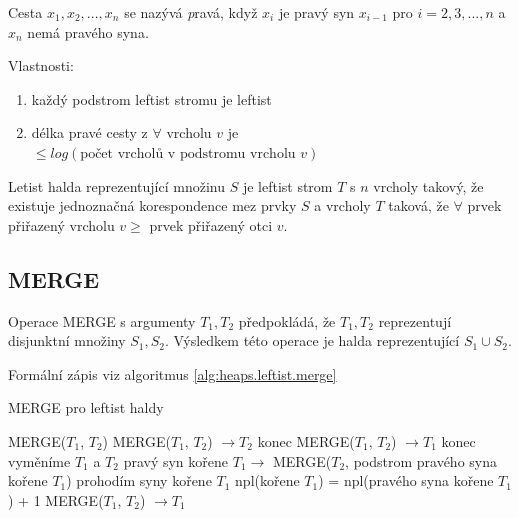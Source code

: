 \begin{defn}
Cesta $x_1, x_2, ..., x_n$ se nazývá {\emph pravá}, když $x_i$ je pravý syn
$x_{i-1}$ pro $i=2,3,...,n$ a $x_n$ nemá pravého syna.
\end{defn}


Vlastnosti: 
\begin{enumerate}
\item každý podstrom leftist stromu je leftist 
\item délka pravé cesty z $\forall$ vrcholu $v$ je 
$\leq log(\text{počet vrcholů v podstromu vrcholu } v)$
\end{enumerate}

\begin{defn}
Letist halda reprezentující množinu $S$ je leftist strom $T$ s $n$ vrcholy
takový, že existuje jednoznačná korespondence mez prvky $S$ a vrcholy
$T$ taková, že $\forall$ prvek přiřazený vrcholu $v \geq$ prvek přiřazený
otci $v$.
\end{defn}


\subsection{MERGE}

Operace MERGE s argumenty $T_1, T_2$ předpokládá, že 
$T_1, T_2$ reprezentují disjunktní množiny $S_1, S_2$.
Výsledkem této operace je halda reprezentující $S_1 \cup S_2$.

Formální zápis viz algoritmus \ref{alg:heaps.leftist.merge}

\begin{algorithm}[!htb]
\caption{MERGE pro leftist haldy}
\label{alg:heaps.leftist.merge}
\begin{algorithmic}
\STATE MERGE($T_1$, $T_2$)
  \STATE MERGE($T_1$, $T_2$) $\rightarrow T_2$ konec 
\ENDIF
{}
  \STATE MERGE($T_1$, $T_2$) $\rightarrow T_1$ konec 
\ENDIF
{}
  \STATE vyměníme $T_1$ a $T_2$
\ENDIF
\STATE pravý syn kořene $T_1 \rightarrow$ MERGE($T_2$, podstrom pravého syna kořene $T_1$)
  \STATE prohodím syny kořene $T_1$
\ENDIF
\STATE npl(kořene $T_1$) = npl(pravého syna kořene $T_1$) + 1
\STATE MERGE($T_1$, $T_2$) $\rightarrow T_1$ 
\end{algorithmic}
\end{algorithm}


